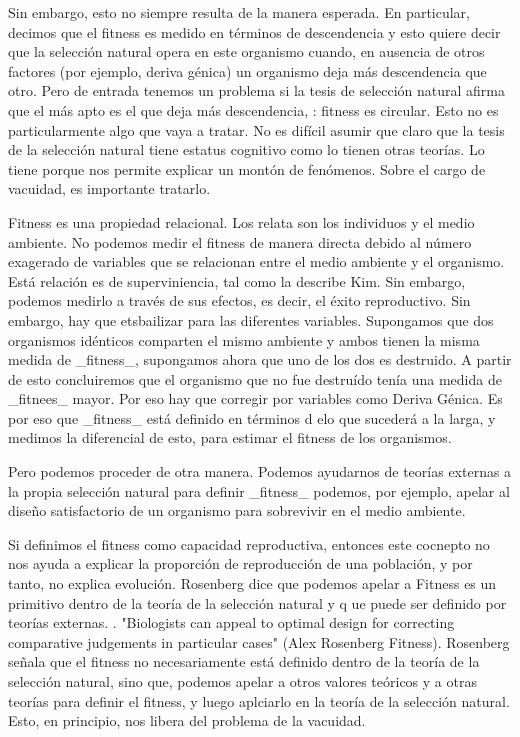 Sin embargo, esto no siempre resulta de la manera esperada. En particular, decimos que el fitness es medido en términos de descendencia y esto quiere decir que la selección natural opera en este organismo cuando, en ausencia de otros factores (por ejemplo, deriva génica) un organismo deja más descendencia que otro. Pero de entrada tenemos un problema si la tesis de selección natural afirma que el más apto es el que deja más descendencia, : fitness es circular. Esto no es particularmente algo que vaya a tratar. No es difícil asumir que claro que la tesis de la selección natural tiene estatus cognitivo como lo tienen otras teorías. Lo tiene porque nos permite explicar un montón de fenómenos. Sobre el cargo de vacuidad, es importante tratarlo.

Fitness es una propiedad relacional. Los relata son los individuos y el medio ambiente. No podemos medir el fitness de manera directa debido al número exagerado de variables que se relacionan entre el medio ambiente y el organismo. Está relación es de superviniencia, tal como la describe Kim. Sin embargo, podemos medirlo a través de sus efectos, es decir, el éxito reproductivo. Sin embargo, hay que etsbailizar para las diferentes variables. Supongamos que dos organismos idénticos comparten el mismo ambiente y ambos tienen la misma medida de _fitness_, supongamos ahora que uno de los dos es destruido. A partir de esto concluiremos que el organismo que no fue destruído tenía una medida de _fitnees_ mayor. Por eso hay que corregir por variables como Deriva Génica. Es por eso que _fitness_ está definido en términos d elo que sucederá a la larga, y medimos la diferencial de esto, para estimar el fitness de los organismos.

Pero podemos proceder de otra manera. Podemos ayudarnos de teorías externas a la propia selección natural para definir _fitness_ podemos, por ejemplo, apelar al diseño satisfactorio de un organismo para sobrevivir en el medio ambiente.

Si definimos el fitness como capacidad reproductiva, entonces este cocnepto no nos ayuda a explicar la proporción de reproducción de una población, y por tanto, no explica evolución. Rosenberg dice que podemos apelar a Fitness es un primitivo dentro de la teoría de la selección natural y q  ue puede ser definido por teorías externas. . "Biologists can appeal to optimal design for correcting comparative judgements in particular cases" (Alex Rosenberg Fitness). Rosenberg señala que el fitness no necesariamente está definido dentro de la teoría de la selección natural, sino que, podemos apelar a otros valores teóricos y a otras teorías para definir el fitness, y luego aplciarlo en la teoría de la selección natural. Esto, en principio, nos libera del problema de la vacuidad.

